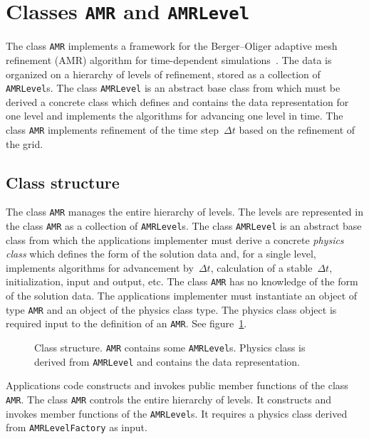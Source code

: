 \section{Classes {\tt AMR} and {\tt AMRLevel}}

The class \verb|AMR| implements a framework for the Berger--Oliger
adaptive mesh refinement (AMR) algorithm for time-dependent
simulations~\cite{bergerOliger:1984}.  The data is organized on a
hierarchy of levels of refinement, stored as a collection of
\verb|AMRLevel|s.  The class \verb|AMRLevel| is an abstract base class
from which must be derived a concrete class which defines and contains
the data representation for one level and implements the algorithms
for advancing one level in time.  The class \verb|AMR| implements
refinement of the time step~$\Delta t$ based on the refinement of the
grid.

\subsection{Class structure}

The class \verb|AMR| manages the entire hierarchy of levels.  The
levels are represented in the class \verb|AMR| as a collection of
\verb|AMRLevel|s.  The class \verb|AMRLevel| is an abstract base class
from which the applications implementer must derive a concrete {\em
physics class\/} which defines the form of the solution data and,
for a single level, implements algorithms for advancement by~$\Delta
t$, calculation of a stable~$\Delta t$, initialization, input and
output, etc.  The class \verb|AMR| has no knowledge of the form of the
solution data.  The applications implementer must instantiate an
object of type \verb|AMR| and an object of the physics class type.
The physics class object is required input to the definition of an
\verb|AMR|.  See figure~\ref{fig:classes}.

\begin{figure}
\vspace{2.5in}
\caption{Class structure.  {\tt AMR} contains some
{\tt AMRLevel}s.  Physics class is derived from
{\tt AMRLevel} and contains the data representation.}
\label{fig:classes}
\end{figure}

Applications code constructs and invokes public member functions of
the class \verb|AMR|.  The class \verb|AMR| controls the entire
hierarchy of levels.  It constructs and invokes member functions of
the \verb|AMRLevel|s.  It requires a physics class derived from
\verb|AMRLevelFactory| as input.

